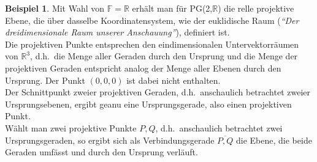 \documentclass[hidelinks]{article}
\theoremstyle{plain}
\theoremstyle{definition}
\newtheorem{bsp}[thm]{Beispiel}
\theoremstyle{rem}
\begin{document}
\begin{sloppypar}
\begin{bsp}
Mit Wahl von $\mathbb{F}=\mathbb{R}$ erhält man für PG(2,$\mathbb{R}$) die relle projektive Ebene, die über dasselbe Koordinatensystem, wie der euklidische Raum (\textit{``Der dreidimensionale Raum unserer Anschauung''}), definiert ist.\\
Die projektiven Punkte entsprechen den eindimensionalen Untervektorräumen von $\mathbb{R}^3$, d.h.\ die Menge aller Geraden durch den Ursprung und die Menge der projektiven Geraden entspricht analog der Menge aller Ebenen durch den Ursprung. Der Punkt $(0,0,0)$ ist dabei nicht enthalten.\\
Der Schnittpunkt zweier projektiven Geraden, d.h.\ anschaulich betrachtet zweier Ursprungsebenen, ergibt geanu eine Ursprungsgerade, also einen projektiven Punkt.\\
Wählt man zwei projektive Punkte $P,Q$, d.h.\ anschaulich betrachtet zwei Ursprungsgeraden, so ergibt sich als Verbindungsgerade $\overline{P,Q}$ die Ebene, die beide Geraden umfässt und durch den Ursprung verläuft.

\begin{figure}[H]
\qquad	
{}
\end{figure}
\end{bsp}
\end{sloppypar}
\end{document}
